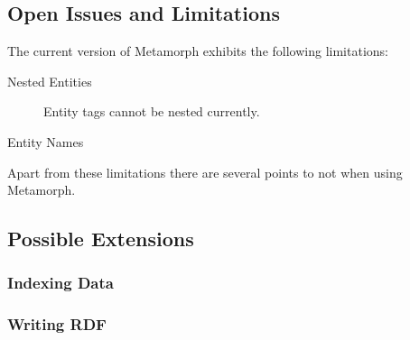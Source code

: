 \documentclass[12pt,a4paper]{article}
\begin{document}
\subsection{Open Issues and Limitations}

The current version of Metamorph exhibits the following limitations:

\begin{description}
\item[Nested Entities] Entity tags cannot be nested currently.
\item[Entity Names] 
\end{description}


Apart from these limitations there are several points to not when using Metamorph.


\subsection{Possible Extensions}
\subsubsection{Indexing Data}
\subsubsection{Writing RDF}
\end{document}
